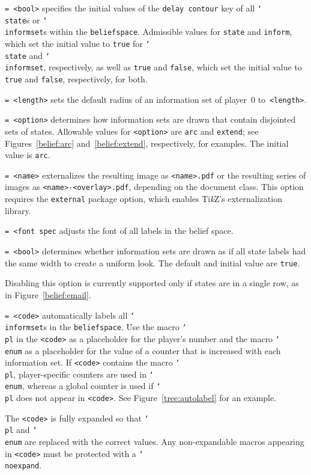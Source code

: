 \documentclass{article}
\newenvironment{desc}{\itemize[leftmargin=50pt]}{\enditemize}
\def\option#1#2{\item[\texttt{#1}] \hskip-1.5pt\texttt{#2}}
\renewcommand{\textbackslash}{\char`\\}
\def\cmd#1{\texttt{\color{cmd}\textbackslash#1}}
\def\TikZ{Ti\emph{k}Z\xspace}
\begin{document}
\begin{desc}
\option{delay contour}{= <bool>} specifies the initial values of the \texttt{delay contour} key of all \cmd{state}s or \cmd{informset}s within the \texttt{beliefspace}. Admissible values for \texttt{state} and \texttt{inform}, which set the initial value to \texttt{true} for \cmd{state} and \cmd{informset}, respectively, as well as \texttt{true} and \texttt{false}, which set the initial value to \texttt{true} and \texttt{false}, respectively, for both.

\option{event}{= <length>} sets the default radius of an information set of player~$0$ to~\texttt{<length>}.

\option{exterior}{= <option>} determines how information sets are drawn that contain disjointed sets of states. Allowable values for \texttt{<option>} are \texttt{arc} and \texttt{extend}; see Figures~\ref{belief:arc} and~\ref{belief:extend}, respectively, for examples. The initial value is \texttt{arc}.

\option{external}{= <name>} externalizes the resulting image as \texttt{<name>.pdf} or the resulting series of images as \texttt{<name>-<overlay>.pdf}, depending on the document class. This option requires the \texttt{external} package option, which enables \TikZ's externalization library.

\option{font}{= <font spec} adjusts the font of all labels in the belief space.

\option{identical width}{= <bool>} determines whether information sets are drawn as if all state labels had the same width to create a uniform look. The default and initial value are \texttt{true}. 

{\color{player4} Disabling this option is currently supported only if states are in a single row, as in Figure~\ref{belief:email}.}

\option{inform autolabel}{= <code>} automatically labels all \cmd{informset}s in the \texttt{beliefspace}. Use the macro \cmd{pl} in the \texttt{<code>} as a placeholder for the player's number and the macro \cmd{enum} as a placeholder for the value of a counter that is increased with each information set. If \texttt{<code>} contains the macro \cmd{pl}, player-specific counters are used in \cmd{enum}, whereas a global counter is used if \cmd{pl} does not appear in \texttt{<code>}. See Figure~\ref{tree:autolabel} for an example.

{\color{player4}The \texttt{<code>} is fully expanded so that \cmd{pl} and \cmd{enum} are replaced with the correct values. Any non-expandable macros appearing in \texttt{<code>} must be protected with a \cmd{noexpand}.}


\end{desc}
\end{document}
